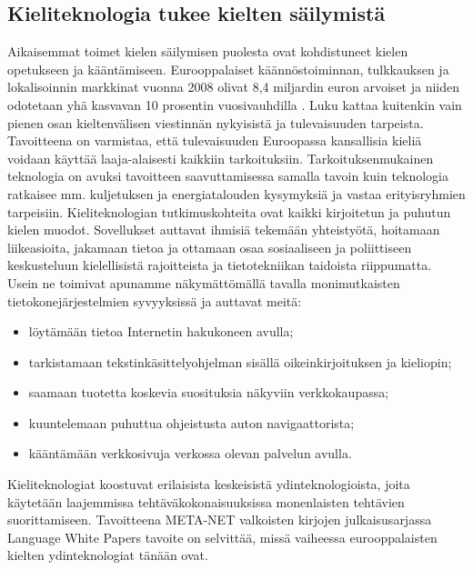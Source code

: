 \documentclass[]{../../metanetpaper}
\begin{document}
\begin{multicols}{2}
\subsection{Kieliteknologia tukee kielten säilymistä}


Aikaisemmat toimet kielen säilymisen puolesta ovat kohdistuneet kielen
opetukseen ja kääntämiseen. Eurooppalaiset käännöstoiminnan, tulkkauksen 
ja lokalisoinnin markkinat vuonna 2008
olivat 8,4 miljardin euron arvoiset ja niiden odotetaan yhä kasvavan
10 prosentin vuosivauhdilla \cite{EC-size}. Luku kattaa kuitenkin vain
pienen osan kieltenvälisen viestinnän nykyisistä ja tulevaisuuden
tarpeista. Tavoitteena on varmistaa, että tulevaisuuden Euroopassa
kansallisia kieliä voidaan käyttää laaja-alaisesti kaikkiin
tarkoituksiin. Tarkoituksenmukainen teknologia on avuksi tavoitteen 
saavuttamisessa samalla tavoin kuin teknologia ratkaisee mm. kuljetuksen ja 
energiatalouden kysymyksiä ja vastaa erityisryhmien tarpeisiin.
Kieliteknologian tutkimuskohteita ovat kaikki kirjoitetun ja puhutun kielen
muodot. Sovellukset auttavat ihmisiä tekemään yhteistyötä, hoitamaan
liikeasioita, jakamaan tietoa ja ottamaan osaa sosiaaliseen ja poliittiseen
keskusteluun kielellisistä rajoitteista ja tietotekniikan taidoista
riippumatta. Usein ne toimivat apunamme näkymättömällä tavalla monimutkaisten
tietokonejärjestelmien syvyyksissä ja auttavat meitä:
\begin{itemize}
\item löytämään tietoa Internetin hakukoneen avulla;

\item tarkistamaan tekstinkäsittelyohjelman sisällä oikeinkirjoituksen ja kieliopin;

\item saamaan tuotetta koskevia suosituksia näkyviin verkkokaupassa;

\item kuuntelemaan puhuttua ohjeistusta auton navigaattorista;

\item kääntämään verkkosivuja verkossa olevan palvelun avulla.
\end{itemize}

Kieliteknologiat koostuvat erilaisista keskeisistä ydinteknologioista, joita
käytetään laajemmissa tehtäväkokonaisuuksissa monenlaisten tehtävien
suorittamiseen. Tavoitteena META-NET valkoisten kirjojen julkaisusarjassa 
Language White Papers tavoite on selvittää, missä vaiheessa eurooppalaisten
kielten ydinteknologiat tänään ovat.


\end{multicols}
\end{document}
